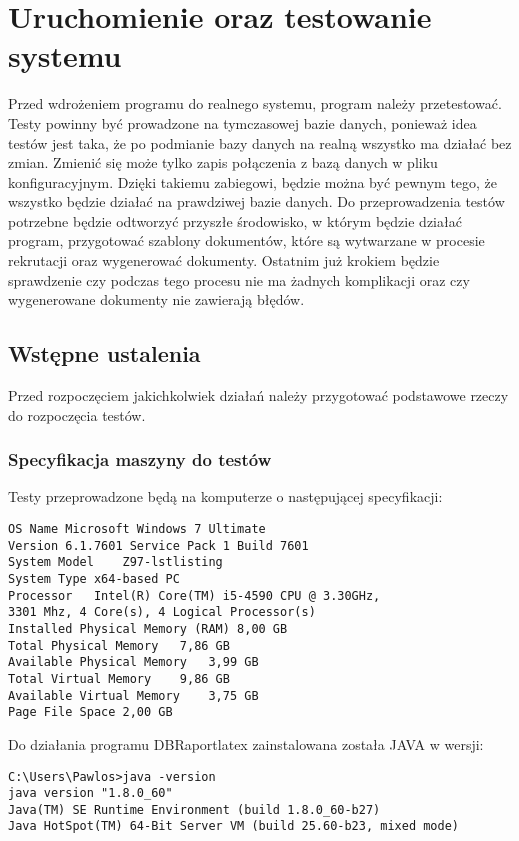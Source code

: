 \chapter{Uruchomienie oraz testowanie systemu}

Przed wdrożeniem programu do realnego systemu, program należy przetestować. Testy powinny być prowadzone na tymczasowej bazie danych, ponieważ idea testów jest taka, że po podmianie bazy danych na realną wszystko ma działać bez zmian. Zmienić się może tylko zapis połączenia z bazą danych w pliku konfiguracyjnym. Dzięki takiemu zabiegowi, będzie można być pewnym tego, że wszystko będzie działać na prawdziwej bazie danych.  Do przeprowadzenia testów potrzebne będzie odtworzyć przyszłe środowisko, w którym będzie działać program, przygotować szablony dokumentów, które są wytwarzane w procesie rekrutacji oraz wygenerować dokumenty. Ostatnim już krokiem będzie sprawdzenie czy podczas tego procesu nie ma żadnych komplikacji oraz czy wygenerowane dokumenty nie zawierają błędów.
\section{Wstępne ustalenia}

Przed rozpoczęciem jakichkolwiek działań należy przygotować podstawowe rzeczy do rozpoczęcia testów.

\subsection{Specyfikacja maszyny do testów}
Testy przeprowadzone będą na komputerze o następującej specyfikacji:
\begin{lstlisting}
OS Name	Microsoft Windows 7 Ultimate
Version	6.1.7601 Service Pack 1 Build 7601
System Model	Z97-lstlisting
System Type	x64-based PC
Processor	Intel(R) Core(TM) i5-4590 CPU @ 3.30GHz,
3301 Mhz, 4 Core(s), 4 Logical Processor(s)
Installed Physical Memory (RAM)	8,00 GB
Total Physical Memory	7,86 GB
Available Physical Memory	3,99 GB
Total Virtual Memory	9,86 GB
Available Virtual Memory	3,75 GB
Page File Space	2,00 GB
\end{lstlisting}

Do działania programu DBRaportlatex zainstalowana została JAVA w wersji:
\begin{lstlisting}
C:\Users\Pawlos>java -version
java version "1.8.0_60"
Java(TM) SE Runtime Environment (build 1.8.0_60-b27)
Java HotSpot(TM) 64-Bit Server VM (build 25.60-b23, mixed mode)
\end{lstlisting}


